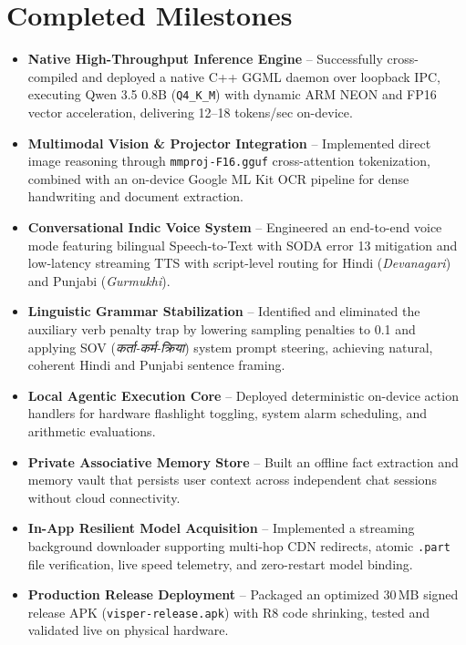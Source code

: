 \documentclass[11pt]{article}
\begin{document}
\section{Completed Milestones}
\begin{itemize}[leftmargin=1.4em, itemsep=2pt]
    \item \textbf{Native High-Throughput Inference Engine} -- Successfully cross-compiled and deployed
    a native C++ GGML daemon over loopback IPC, executing Qwen 3.5 0.8B (\texttt{Q4\_K\_M}) with dynamic
    ARM NEON and FP16 vector acceleration, delivering 12--18 tokens/sec on-device.
    \item \textbf{Multimodal Vision \& Projector Integration} -- Implemented direct image reasoning
    through \texttt{mmproj-F16.gguf} cross-attention tokenization, combined with an on-device Google ML
    Kit OCR pipeline for dense handwriting and document extraction.
    \item \textbf{Conversational Indic Voice System} -- Engineered an end-to-end voice mode featuring
    bilingual Speech-to-Text with SODA error 13 mitigation and low-latency streaming TTS with
    script-level routing for Hindi (\textit{Devanagari}) and Punjabi (\textit{Gurmukhi}).
    \item \textbf{Linguistic Grammar Stabilization} -- Identified and eliminated the auxiliary verb
    penalty trap by lowering sampling penalties to 0.1 and applying SOV (\textit{कर्ता-कर्म-क्रिया})
    system prompt steering, achieving natural, coherent Hindi and Punjabi sentence framing.
    \item \textbf{Local Agentic Execution Core} -- Deployed deterministic on-device action handlers
    for hardware flashlight toggling, system alarm scheduling, and arithmetic evaluations.
    \item \textbf{Private Associative Memory Store} -- Built an offline fact extraction and memory
    vault that persists user context across independent chat sessions without cloud connectivity.
    \item \textbf{In-App Resilient Model Acquisition} -- Implemented a streaming background
    downloader supporting multi-hop CDN redirects, atomic \texttt{.part} file verification, live speed
    telemetry, and zero-restart model binding.
    \item \textbf{Production Release Deployment} -- Packaged an optimized 30\,MB signed release APK
    (\texttt{visper-release.apk}) with R8 code shrinking, tested and validated live on physical hardware.
\end{itemize}
\end{document}
